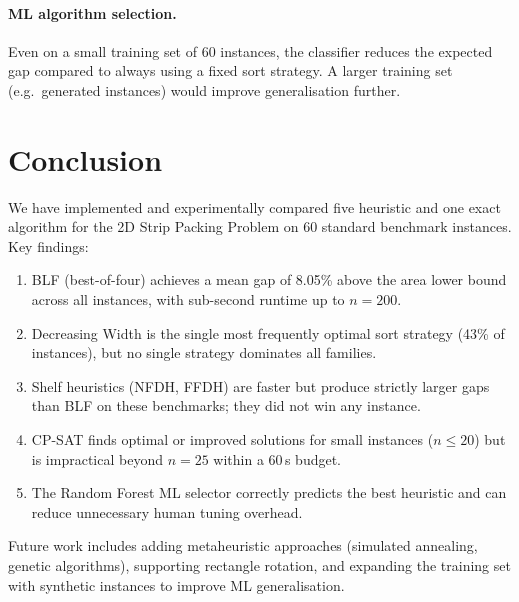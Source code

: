 \documentclass[11pt,a4paper]{article}
\begin{document}
\paragraph{ML algorithm selection.}
Even on a small training set of 60 instances, the classifier reduces the
expected gap compared to always using a fixed sort strategy.
A larger training set (e.g.\ generated instances) would improve generalisation
further.

\section{Conclusion}

We have implemented and experimentally compared five heuristic and one exact
algorithm for the 2D Strip Packing Problem on 60 standard benchmark instances.
Key findings:
\begin{enumerate}
  \item BLF (best-of-four) achieves a mean gap of 8.05\% above the area lower
        bound across all instances, with sub-second runtime up to $n=200$.
  \item Decreasing Width is the single most frequently optimal sort strategy
        (43\% of instances), but no single strategy dominates all families.
  \item Shelf heuristics (NFDH, FFDH) are faster but produce strictly larger
        gaps than BLF on these benchmarks; they did not win any instance.
  \item CP-SAT finds optimal or improved solutions for small instances
        ($n \le 20$) but is impractical beyond $n=25$ within a 60\,s budget.
  \item The Random Forest ML selector correctly predicts the best heuristic
        and can reduce unnecessary human tuning overhead.
\end{enumerate}

Future work includes adding metaheuristic approaches (simulated annealing,
genetic algorithms), supporting rectangle rotation, and expanding the training
set with synthetic instances to improve ML generalisation.
\end{document}
